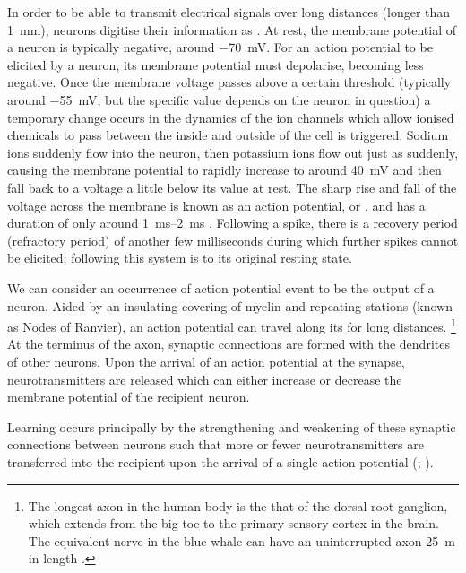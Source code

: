 In order to be able to transmit electrical signals over long distances (longer than \SI{1}{\milli\metre}), neurons digitise their information as .
At rest, the membrane potential of a neuron is typically negative, around \SI{-70}{\milli\volt}.
For an action potential to be elicited by a neuron, its membrane potential must depolarise, becoming less negative.
Once the membrane voltage passes above a certain threshold (typically around \SI{-55}{\milli\volt}, but the specific value depends on the neuron in question) a temporary change occurs in the dynamics of the ion channels which allow ionised chemicals to pass between the inside and outside of the cell is triggered.
Sodium ions suddenly flow into the neuron, then potassium ions flow out just as suddenly, causing the membrane potential to rapidly increase to around \SI{+40}{\milli\volt} and then fall back to a voltage a little below its value at rest.
The sharp rise and fall of the voltage across the membrane is known as an action potential, or , and has a duration of only around \SIrange{1}{2}{\milli\second} \citep[Chapter~1]{Dayan2001}.
Following a spike, there is a recovery period (refractory period) of another few milliseconds during which further spikes cannot be elicited; following this system is to its original resting state.

We can consider an occurrence of action potential event to be the output of a neuron.
Aided by an insulating covering of myelin and repeating stations (known as Nodes of Ranvier), an action potential can travel along its  for long distances.%
\footnote{
The longest axon in the human body is the that of the dorsal root ganglion, which extends from the big toe to the primary sensory cortex in the brain.
The equivalent nerve in the blue whale can have an uninterrupted axon \SI{25}{\metre} in length \citep{Smith2009,Voytek2012}.
}
At the terminus of the axon, synaptic connections are formed with the dendrites of other neurons.
Upon the arrival of an action potential at the synapse, neurotransmitters are released which can either increase or decrease the membrane potential of the recipient neuron.

Learning occurs principally by the strengthening and weakening of these synaptic connections between neurons such that more or fewer neurotransmitters are transferred into the recipient upon the arrival of a single action potential (\citealp[Chapter~23]{nsbook}; \citealp[Chapter~8]{Dayan2001}).


